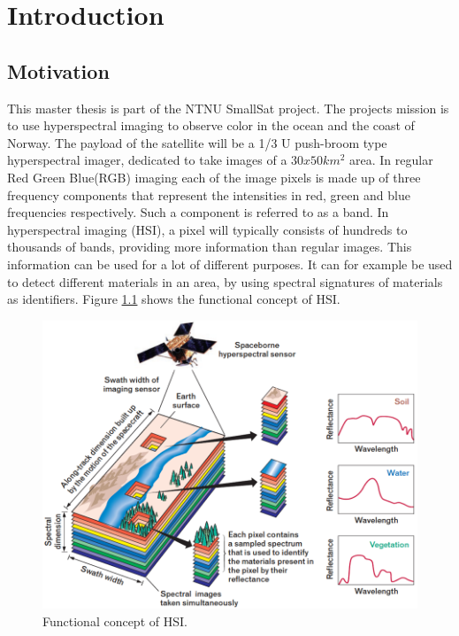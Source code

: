 \newpage
\chapter{Introduction}
\label{sec:introduction}
\section{Motivation}

This master thesis is part of the NTNU SmallSat \cite{SmallSat_project_description} project. The projects mission is to use hyperspectral imaging to observe color in the ocean and the coast of Norway. The payload of the satellite will be a 1/3 U push-broom type hyperspectral imager, dedicated to take images of a $30x50 km^2$ area. In regular Red Green Blue(RGB) imaging each of the image pixels is made up of three frequency components that represent the intensities in red, green and blue frequencies respectively. Such a component is referred to as a band. In hyperspectral imaging (HSI), a pixel will typically consists of hundreds to thousands of bands, providing more information than regular images. This information can be used for a lot of different purposes. It can for example be used to detect different materials in an area, by using spectral signatures of materials as identifiers. Figure \ref{fig:HSI_concept} shows the functional concept of HSI.\\

\begin{figure}[H]
\centering
   \includegraphics[scale=0.35]{images/Imaging-Spectroscopy-Concept.png}
  \caption{ Functional concept of HSI.\cite{HSI_concept} } 
  \label{fig:HSI_concept}
\end{figure}


